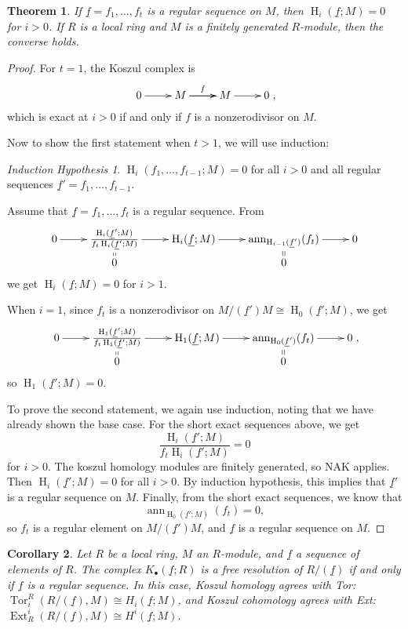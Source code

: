 \documentclass[11pt]{book}
\newtheorem{theorem}{Theorem}[chapter]
\newtheorem{corollary}[theorem]{Corollary}
\numberwithin{equation}{section}
\numberwithin{theorem}{chapter}
\theoremstyle{definition}
\newtheorem*{basic properties}{Basic Properties}
\newtheorem*{Important Remark}{Important Remark}
\theoremstyle{remark}
\newtheorem*{IH*}{Induction Hypothesis}
\newcommand{\Ext}{\operatorname{Ext}}
\newcommand{\Tor}{\operatorname{Tor}}
\newcommand{\ann}{\operatorname{ann}}
\renewcommand{\H}{\operatorname{H}}
\begin{document}
\begin{theorem}
	If $\underline{f} = f_1, \ldots, f_t$ is a regular sequence on $M$, then $\H_i(\underline{f};M) = 0$ for $i > 0$. If $R$ is a local ring and $M$ is a finitely generated $R$-module, then the converse holds.
\end{theorem}


\begin{proof}
	For $t=1$, the Koszul complex is
	$$\xymatrix{0 \ar[r] & M \ar[r]^-f \ar[r] & M \ar[r] & 0},$$
	which is exact at $i >0$ if and only if $f$ is a nonzerodivisor on $M$.
	
	Now to show the first statement when $t>1$, we will use induction:
	\begin{IH*}
	$\H_i(f_1, \ldots, f_{t-1};M) = 0 $ for all $i>0$ and all regular sequences 	$\underline{f}'=f_1, \ldots, f_{t-1}$.
	\end{IH*}

Assume that $\underline{f} = f_1, \ldots, f_{t}$ is a regular sequence. From
$$\xymatrix@R=1mm{0 \ar[r] &  \frac{\H_i(\underline{f}';M)}{f_t\H_i( \underline{f}';M)} \ar[r] & \H_i(\underline{f};M) \ar[r] & \ann_{\H_{i-1}(\underline{f}')}(f_t) \ar[r] & 0 \\ & 0 \ar@{=}[u] & & 0 \ar@{=}[u]}$$
we get $\H_i(\underline{f};M)=0$ for $i>1$.

When $i=1$, since $f_t$ is a nonzerodivisor on $M/(\underline{f}')M \cong \H_0(\underline{f}';M)$, we get
	$$\xymatrix@R=1mm{0 \ar[r] &  \frac{\H_1(\underline{f}';M)}{f_t\H_1( \underline{f}';M)} \ar[r] & \H_1(\underline{f};M) \ar[r] & \ann_{\H_{0}(\underline{f}')}(f_t) \ar[r] & 0 \\
	& 0 \ar@{=}[u] & & 0 \ar@{=}[u]},$$
	so $\H_1( \underline{f}'; M) = 0$.
	
	To prove the second statement, we again use induction, noting that we have already shown the base case. For the short exact sequences above, we get
	$$\frac{\H_i(\underline{f}';M)}{f_t \H_i(\underline{f}';M)} = 0$$
	for $i>0$. The koszul homology modules are finitely generated, so NAK applies. Then $\H_i(\underline{f}';M) = 0$ for all $i>0$. By induction hypothesis, this implies that $\underline{f}'$ is a regular sequence on $M$. Finally, from the short exact sequences, we know that
	$$\ann_{\H_0(\underline{f}';M)}(f_t) = 0,$$
	so $f_t$ is a regular element on $M/(\underline{f}')M$, and $\underline{f}$ is a regular sequence on $M$.
\end{proof}


\begin{corollary}
	 Let $R$ be a local ring, $M$ an $R$-module, and $\underline{f}$ a sequence of elements of $R$. The complex $K_\bullet(\underline{f};R)$ is a free resolution of $R/(\underline{f})$ if and only if $\underline{f}$ is a regular sequence. In this case, Koszul homology agrees with Tor: $\Tor_i^R(R/(\underline{f}),M)\cong H_i(\underline{f};M)$, and Koszul cohomology agrees with Ext: $\Ext^i_R(R/(\underline{f}),M)\cong H^i(\underline{f};M)$.
\end{corollary}
\end{document}
